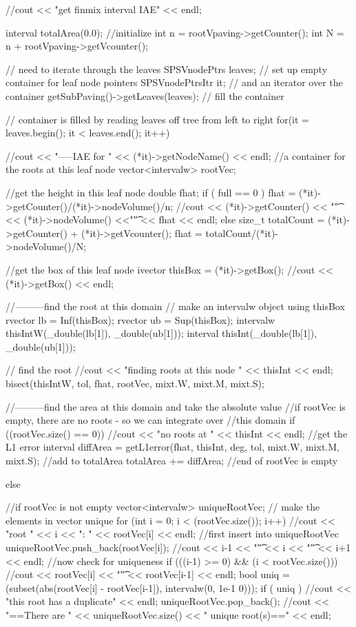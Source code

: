 \begin{DoxyCode}
{
  //cout << "get finmix interval IAE" << endl;
  
  interval totalArea(0.0); //initialize
  int n = rootVpaving->getCounter();
  int N = n + rootVpaving->getVcounter();
  
  // need to iterate through the leaves
  SPSVnodePtrs leaves; // set up empty container for leaf node pointers
  SPSVnodePtrsItr it; // and an iterator over the container
  getSubPaving()->getLeaves(leaves); // fill the container
  
  // container is filled by reading leaves off tree from left to right
  for(it = leaves.begin(); it < leaves.end(); it++) {
    //cout << "-----IAE for " << (*it)->getNodeName() << endl;
    //a container for the roots at this leaf node
    vector<intervalw> rootVec;
    
    //get the height in this leaf node
    double fhat;
    if ( full == 0 ) { 
      fhat = (*it)->getCounter()/(*it)->nodeVolume()/n;
      //cout << (*it)->getCounter() << "\t" << (*it)->nodeVolume() <<"\t" <<
       fhat << endl;
    }
    else {
      size_t totalCount = (*it)->getCounter() + (*it)->getVcounter();
      fhat = totalCount/(*it)->nodeVolume()/N;
    }

    //get the box of this leaf node
    ivector thisBox = (*it)->getBox();
    //cout << (*it)->getBox() << endl;
    
    //---------find the root at this domain
    // make an intervalw object using thisBox
    rvector lb = Inf(thisBox);
    rvector ub = Sup(thisBox);
    intervalw thisIntW(_double(lb[1]), _double(ub[1]));
    interval thisInt(_double(lb[1]), _double(ub[1]));
    
    // find the root
    //cout << "finding roots at this node " << thisInt << endl;
    bisect(thisIntW, tol, fhat, rootVec, mixt.W, mixt.M, mixt.S); 

    //---------find the area at this domain and take the absolute value
    //if rootVec is empty, there are no roots - so we can integrate over
    //this domain
    if ((rootVec.size() == 0)) { 
      //cout << "no roots at " << thisInt << endl;
      //get the L1 error
      interval diffArea = getL1error(fhat, thisInt, deg, tol, mixt.W, mixt.M, 
      mixt.S);
      //add to totalArea
      totalArea += diffArea;
    } //end of rootVec is empty

    else { //if rootVec is not empty
      vector<intervalw> uniqueRootVec;
      // make the elements in vector unique
      for (int i = 0; i < (rootVec.size()); i++) {
        //cout << "root " << i << ": " << rootVec[i] << endl;
        //first insert into uniqueRootVec
        uniqueRootVec.push_back(rootVec[i]);
        //cout << i-1 << "\t" << i << "\t" << i+1 << endl;
        //now check for uniqueness
        if (((i-1) >= 0) && (i < rootVec.size())) {
          //cout << rootVec[i] << "\t" << rootVec[i-1] << endl;
          bool uniq = (subset(abs(rootVec[i] - rootVec[i-1]), intervalw(0, 1e-1
      0)));
          if ( uniq ) { 
            //cout << "this root has a duplicate" << endl;
            uniqueRootVec.pop_back(); }
        }
      }
      //cout << "==There are " << uniqueRootVec.size() << " unique root(s)=="
       << endl;
      
}}}
\end{DoxyCode}
